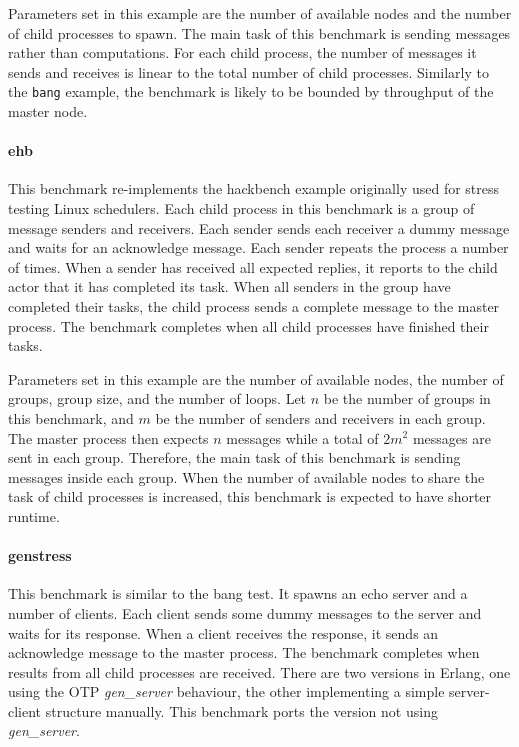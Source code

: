 Parameters set in this example are the number of available nodes and the number 
of child processes to spawn.  The main task of 
this benchmark is sending messages rather than computations.  For each child 
process, the number of messages it sends and receives is linear to the total 
number of child processes.  Similarly to the {\tt bang} example, the benchmark 
is likely to be bounded by throughput of the master node.


\paragraph{ehb} This benchmark re-implements the hackbench example 
\citep{hackbench} originally used for stress testing Linux schedulers.  
Each child process in this benchmark is a group of message senders and 
receivers.  Each sender sends each receiver a dummy message and waits for an 
acknowledge message.  Each sender repeats the process a number of times.  
When a sender has received all expected replies, it reports to the child actor 
that it has completed its task.  When all senders in the group have completed 
their tasks, the child process sends a complete message to the master process.  
The benchmark completes when all child processes have finished their tasks. 

Parameters set in this example are the number of available nodes, the number 
of groups, group size, and the number of loops.  Let $n$ be the number of 
groups in this benchmark, and $m$ be the number of senders and receivers in 
each group.  The master process then expects $n$ messages while a total of 
$2m^2$ messages are sent in each group.  Therefore, the main task of this 
benchmark is sending messages inside each group.  When the number of
available nodes to share the task of child processes is increased, this 
benchmark is expected to have shorter runtime.


\paragraph{genstress}  This benchmark is similar to the bang test.  It spawns an
echo server and a number of clients.  Each client sends some dummy messages to
the server and waits for its response.  When a client receives the response, 
it sends an acknowledge message to the master process.  The benchmark completes 
when results from all child processes are received.  There are two versions 
in Erlang, one using the OTP {\it gen\_server} behaviour, the other 
implementing a simple server-client structure manually.  This 
benchmark ports the version not using {\it gen\_server}.  

